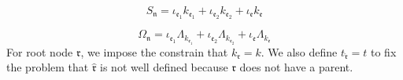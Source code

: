 \begin{lem}
\begin{equation}\label{eq.defnS_noperator}
    S_{\mathfrak{n}}=\iota_{\mathfrak{e}_1}k_{\mathfrak{e}_1}+\iota_{\mathfrak{e}_2}k_{\mathfrak{e}_2}+\iota_{\mathfrak{e}}k_{\mathfrak{e}}
\end{equation}

\begin{equation}
    \Omega_{\mathfrak{n}}=\iota_{\mathfrak{e}_1}\Lambda_{k_{\mathfrak{e}_1}}+\iota_{\mathfrak{e}_2}\Lambda_{k_{\mathfrak{e}_2}}+\iota_{\mathfrak{e}}\Lambda_{k_{\mathfrak{e}}}
\end{equation}
For root node $\mathfrak{r}$, we impose the constrain that $k_{\mathfrak{r}}=k$. We also define $t_{\widehat{\mathfrak{r}}}=t$ to fix the problem that $\widehat{\mathfrak{r}}$ is not well defined because $\mathfrak{r}$ does not have a parent. 


\end{lem}
